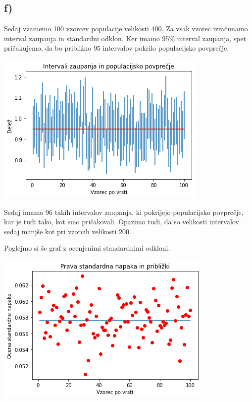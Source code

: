 \documentclass[12pt, a4paper]{article}
\begin{document}
\subsection*{f)}

Sedaj vzamemo 100 vzorcev populacije velikosti 400. Za vsak vzorec izračunamo
interval zaupanja in standardni odklon. Ker imamo 95\% interval zaupanja, spet
pričakujemo, da bo približno 95 intervalov pokrilo populacijsko povprečje.

\begin{center}
    \includegraphics[scale=0.5]{Intervali_zaupanja_400.png}
\end{center}

Sedaj imamo 96 takih intervalov zaupanja, ki pokrijejo populacijsko povprečje,
kar je tudi tako, kot smo pričakovali. Opazimo tudi, da so velikosti intervalov
sedaj manjše kot pri vzorcih velikosti 200.

Poglejmo si še graf z ocenjenimi standardnimi odkloni.

\begin{center}
    \includegraphics[scale=0.5]{St_napaka_400.png}
\end{center}
\end{document}
